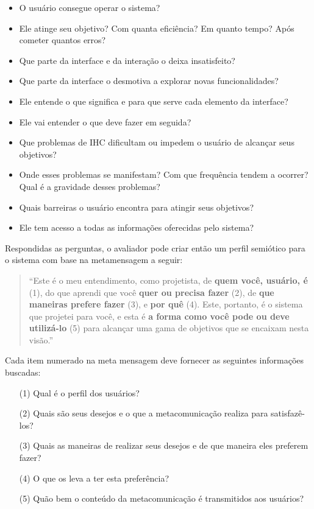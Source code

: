 \begin{itemize}
\item O usuário consegue operar o sistema?
\item Ele atinge seu objetivo? Com quanta eficiência? Em quanto tempo? Após cometer quantos erros?
\item Que parte da interface e da interação o deixa insatisfeito?
\item Que parte da interface o desmotiva a explorar novas funcionalidades?
\item Ele entende o que significa e para que serve cada elemento da interface?
\item Ele vai entender o que deve fazer em seguida?
\item Que problemas de IHC dificultam ou impedem o usuário de alcançar seus objetivos?
\item Onde esses problemas se manifestam? Com que frequência tendem a ocorrer? Qual é a gravidade desses problemas?
\item Quais barreiras o usuário encontra para atingir seus objetivos?
\item Ele tem acesso a todas as informações oferecidas pelo sistema?
\end{itemize} 

\indent Respondidas as perguntas, o avaliador pode criar então um perfil semiótico para o sistema com base na metamensagem a seguir:

\begin{quote}
``Este é o meu entendimento, como projetista, de \textbf{quem você, usuário, é} (1), do que aprendi que você \textbf{quer ou precisa fazer} (2), de \textbf{que maneiras prefere fazer} (3), e \textbf{por quê} (4). Este, portanto, é o sistema que projetei para você, e esta é \textbf{a forma como você pode ou deve utilizá-lo} (5) para alcançar uma gama de objetivos que se encaixam nesta visão.''~\cite[pag. 78]{IHCbook}
\end{quote}

\indent Cada item numerado na meta mensagem deve fornecer as seguintes informações buscadas:

\begin{itemize}
\item[(1)] Qual é o perfil dos usuários?
\item[(2)] Quais são seus desejos e o que a metacomunicação realiza para satisfazê-los?
\item[(3)] Quais as maneiras de realizar seus desejos e de que maneira eles preferem fazer?
\item[(4)] O que os leva a ter esta preferência?
\item[(5)] Quão bem o conteúdo da metacomunicação é transmitidos aos usuários?
\end{itemize}


